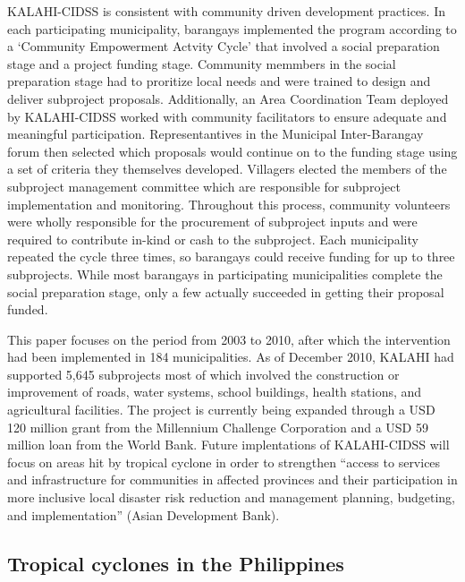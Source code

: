 \documentclass[12pt]{article}
\begin{document}
	KALAHI-CIDSS is consistent with community driven development practices. In each participating municipality, barangays implemented the program according to a `Community Empowerment Actvity Cycle' that involved a social preparation stage and a project funding stage. Community memmbers in the social preparation stage had to proritize local needs and were trained to design and deliver subproject proposals. Additionally, an Area Coordination Team deployed by KALAHI-CIDSS worked with community facilitators to ensure adequate and meaningful participation. Representantives in the Municipal Inter-Barangay forum then selected which proposals would continue on to the funding stage using a set of criteria they themselves developed. Villagers elected the members of the subproject management committee which are responsible for subproject implementation and monitoring. Throughout this process, community volunteers were wholly responsible for the procurement of subproject inputs and were required to contribute in-kind or cash to the subproject. Each municipality repeated the cycle three times, so barangays could receive funding for up to three subprojects. While most barangays in participating municipalities complete the social preparation stage, only a few actually succeeded in getting their proposal funded. 

	This paper focuses on the period from 2003 to 2010, after which the intervention had been implemented in 184 municipalities. As of December 2010, KALAHI had supported 5,645 subprojects most of which involved the construction or improvement of roads, water systems, school buildings, health stations, and agricultural facilities. The project is currently being expanded through a USD 120 million grant from the Millennium Challenge Corporation and a USD 59 million loan from the World Bank. Future implentations of KALAHI-CIDSS will focus on areas hit by tropical cyclone in order to strengthen ``access to services and infrastructure for communities in affected provinces and their participation in more inclusive local disaster risk reduction and management planning, budgeting, and implementation'' (Asian Development Bank).


	\subsection{Tropical cyclones in the Philippines}
\end{document}
